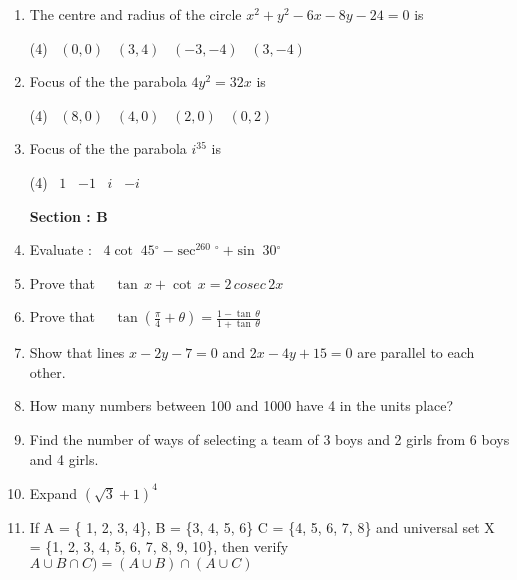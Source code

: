 \documentclass[12pt,a4paper]{article}
\newcommand{\degree}{$^{\circ}\ $} %
\begin{document}
\begin {enumerate}

\item The centre and radius of the circle $x^2 + y^2 - 6x - 8y - 24 = 0$ is

\begin{tasks}(4)
\task\ $(0,0)$
\task\ $(3,4)$
\task\ $(-3,-4)$
\task\ $(3,-4)$
\end{tasks}

\item Focus of the the parabola $4y^2 = 32x$ is
\begin{tasks}(4)
\task\ $(8,0)$
\task\ $(4,0)$
\task\ $(2,0)$
\task\ $(0,2)$
\end{tasks}

\item Focus of the the parabola $i^{35}$ is
\begin{tasks}(4)
\task\ $1$
\task\ $-1$
\task\ $i$
\task\ $-i$
\end{tasks}



\begin{center}

\textbf {Section : B}

\end{center}

\item Evaluate : \  $4\cot\;45$\degree $-\sec^260$\degree $ + \sin\;30$\degree 

\item Prove that \ \ $\tan\,x + \cot\,x = 2\, cosec\,2x $


\item Prove that \ \ $\tan \left(\frac{\pi}{4}+\theta \right)=\frac{1-\tan\,\theta}{1+\tan\,\theta}$ 

\item Show that lines $x-2y-7=0$ and $2x-4y+15=0$ are parallel to each other.

\item How many numbers between 100 and 1000
have 4 in the units place?


\item Find the number of ways of selecting a team
of 3 boys and 2 girls from 6 boys and 4 girls.

\item Expand  $\left(\sqrt{3}+1\right)^4 $ 

\item  If A = \{ 1, 2, 3, 4\}, B = \{3, 4, 5, 6\}
		  C = \{4, 5, 6, 7, 8\} and universal set  X = \{1, 2, 3, 4, 5, 6, 7, 8, 9, 10\}, then verify $ A \cup B\cap C) = (A\cup B) \cap (A \cup C)$


\end{enumerate}
\end{document}
